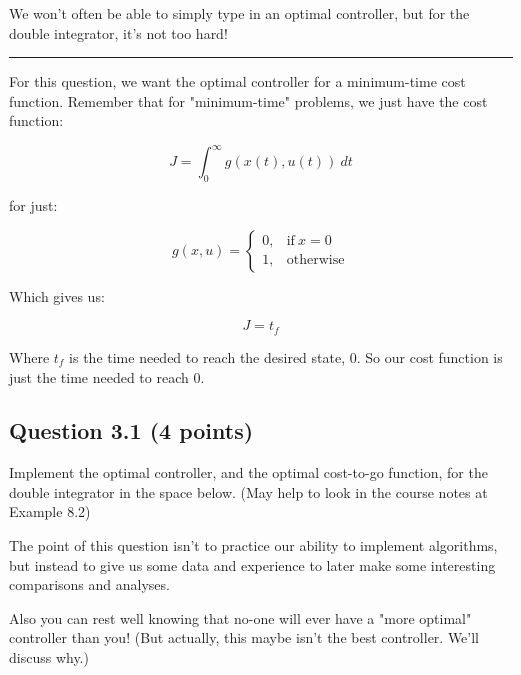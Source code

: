 \documentclass[11pt]{article}
\begin{document}
We won't often be able to simply type in an optimal controller, but for
the double integrator, it's not too hard!

\begin{center}\rule{0.5\linewidth}{\linethickness}\end{center}

For this question, we want the optimal controller for a minimum-time
cost function. Remember that for "minimum-time" problems, we just have
the cost function:

\[ J = \int_0^{\infty} g(x(t),u(t)) \ dt \]

for just:

\[ g(x,u) = \begin{cases}
      0, & \text{if}\ x = 0 \\
      1, & \text{otherwise}
    \end{cases} \]

Which gives us:

\[ J = t_f \]

Where \(t_f\) is the time needed to reach the desired state, 0. So our
cost function is just the time needed to reach 0.

    \subsection{Question 3.1 (4 points)}\label{question-3.1-4-points}

Implement the optimal controller, and the optimal cost-to-go function,
for the double integrator in the space below. (May help to look in the
course notes at Example 8.2)

The point of this question isn't to practice our ability to implement
algorithms, but instead to give us some data and experience to later
make some interesting comparisons and analyses.

Also you can rest well knowing that no-one will ever have a "more
optimal" controller than you! (But actually, this maybe isn't the best
controller. We'll discuss why.)
\end{document}
